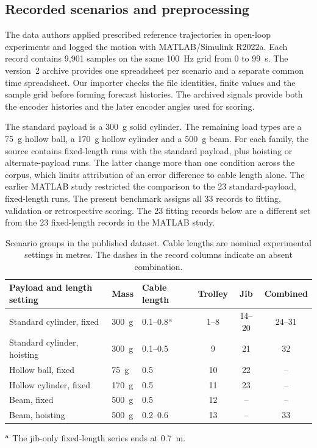 \subsection{Recorded scenarios and preprocessing}

The data authors applied prescribed reference trajectories in open-loop experiments and logged the motion with MATLAB/Simulink R2022a. Each record contains 9,901 samples on the same 100~Hz grid from 0 to 99~s. The version~2 archive provides one spreadsheet per scenario and a separate common time spreadsheet. Our importer checks the file identities, finite values and the sample grid before forming forecast histories. The archived signals provide both the encoder histories and the later encoder angles used for scoring.

The standard payload is a 300~g solid cylinder. The remaining load types are a 75~g hollow ball, a 170~g hollow cylinder and a 500~g beam. For each family, the source contains fixed-length runs with the standard payload, plus hoisting or alternate-payload runs. The latter change more than one condition across the corpus, which limits attribution of an error difference to cable length alone. The earlier MATLAB study restricted the comparison to the 23 standard-payload, fixed-length runs. The present benchmark assigns all 33 records to fitting, validation or retrospective scoring. The 23 fitting records below are a different set from the 23 fixed-length records in the MATLAB study.

\begin{table}[H]
\centering\small
\caption{Scenario groups in the published dataset. Cable lengths are nominal experimental settings in metres. The dashes in the record columns indicate an absent combination.}
\label{tab:scenarios}
\begin{tabular}{@{}p{.32\linewidth}llccc@{}}
\toprule
Payload and length setting & Mass & Cable length & Trolley & Jib & Combined \\
\midrule
Standard cylinder, fixed & 300~g & 0.1--0.8$^{\rm a}$ & 1--8 & 14--20 & 24--31 \\
Standard cylinder, hoisting & 300~g & 0.1--0.5 & 9 & 21 & 32 \\
Hollow ball, fixed & 75~g & 0.5 & 10 & 22 & -- \\
Hollow cylinder, fixed & 170~g & 0.5 & 11 & 23 & -- \\
Beam, fixed & 500~g & 0.5 & 12 & -- & -- \\
Beam, hoisting & 500~g & 0.2--0.6 & 13 & -- & 33 \\
\bottomrule
\end{tabular}

\parbox{\linewidth}{\small\smallskip $^{\rm a}$ The jib-only fixed-length series ends at 0.7~m.}
\end{table}


